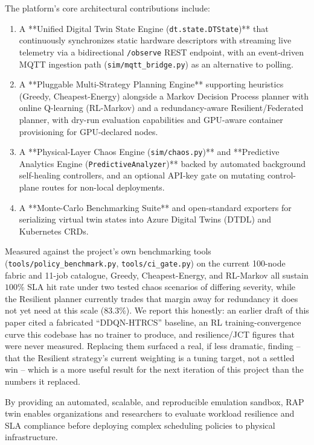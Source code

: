 \documentclass[twoside,twocolumn,10pt]{article}
\begin{document}
The platform's core architectural contributions include:
\begin{enumerate}
    \item A **Unified Digital Twin State Engine (\texttt{dt.state.DTState})** that continuously synchronizes static hardware descriptors with streaming live telemetry via a bidirectional \texttt{/observe} REST endpoint, with an event-driven MQTT ingestion path (\texttt{sim/mqtt\_bridge.py}) as an alternative to polling.
    \item A **Pluggable Multi-Strategy Planning Engine** supporting heuristics (Greedy, Cheapest-Energy) alongside a Markov Decision Process planner with online Q-learning (RL-Markov) and a redundancy-aware Resilient/Federated planner, with dry-run evaluation capabilities and GPU-aware container provisioning for GPU-declared nodes.
    \item A **Physical-Layer Chaos Engine (\texttt{sim/chaos.py})** and **Predictive Analytics Engine (\texttt{PredictiveAnalyzer})** backed by automated background self-healing controllers, and an optional API-key gate on mutating control-plane routes for non-local deployments.
    \item A **Monte-Carlo Benchmarking Suite** and open-standard exporters for serializing virtual twin states into Azure Digital Twins (DTDL) and Kubernetes CRDs.
\end{enumerate}

Measured against the project's own benchmarking tools (\texttt{tools/policy\_benchmark.py}, \texttt{tools/ci\_gate.py}) on the current 100-node fabric and 11-job catalogue, Greedy, Cheapest-Energy, and RL-Markov all sustain $100\%$ SLA hit rate under two tested chaos scenarios of differing severity, while the Resilient planner currently trades that margin away for redundancy it does not yet need at this scale ($83.3\%$). We report this honestly: an earlier draft of this paper cited a fabricated ``DDQN-HTRCS'' baseline, an RL training-convergence curve this codebase has no trainer to produce, and resilience/JCT figures that were never measured. Replacing them surfaced a real, if less dramatic, finding -- that the Resilient strategy's current weighting is a tuning target, not a settled win -- which is a more useful result for the next iteration of this project than the numbers it replaced.

By providing an automated, scalable, and reproducible emulation sandbox, RAP twin enables organizations and researchers to evaluate workload resilience and SLA compliance before deploying complex scheduling policies to physical infrastructure.

\balance
\printbibliography
\end{document}
